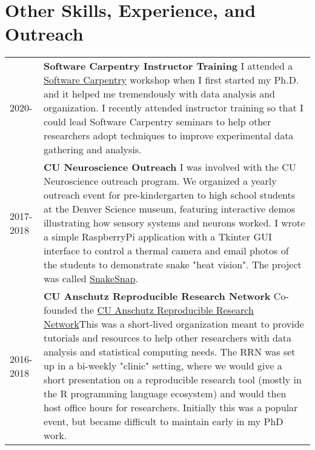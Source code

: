 \documentclass[11pt]{article}
\begin{document}
\section*{Other Skills, Experience, and Outreach}
\label{sec:orga6594b6}
\begin{tabular}{lp{}}
2020-& \textbf{Software Carpentry Instructor Training} \newline I attended a \href{https://software-carpentry.org/}{Software Carpentry} workshop when I first started my Ph.D. and it helped me tremendously with data analysis and organization. I recently attended instructor training so that I could lead Software Carpentry seminars to help other researchers adopt techniques to improve experimental data gathering and analysis.\\
2017-2018& \textbf{CU Neuroscience Outreach}\newline
I was involved with the CU Neuroscience outreach program. We organized a yearly outreach event for pre-kindergarten to high school students at the Denver Science museum, featuring interactive demos illustrating how sensory systems and neurons worked. I wrote a simple RaspberryPi application with a Tkinter GUI interface to control a thermal camera and email photos of the students to demonstrate snake "heat vision". The project was called \href{https://github.com/nkicg6/thermalsnap}{SnakeSnap}.\\
2016-2018& \textbf{CU Anschutz Reproducible Research Network} \newline Co-founded the \href{https://ucd-reproducible-research-clinic.github.io/members.html}{CU Anschutz Reproducible Research Network}\newline This was a short-lived organization meant to provide tutorials and resources to help other researchers with data analysis and statistical computing needs. The RRN was set up in a bi-weekly "clinic" setting, where we would give a short presentation on a reproducible research tool (mostly in the R programming language ecosystem) and would then host office hours for researchers. Initially this was a popular event, but became difficult to maintain early in my PhD work.\\
\end{tabular}
\end{document}
